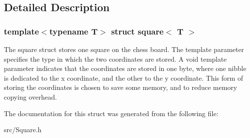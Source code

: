 \subsection{Detailed Description}
\subsubsection*{template$<$typename T$>$\newline
struct square$<$ T $>$}

The square struct stores one square on the chess board. The template parameter specifies the type in which the two coordinates are stored. A void template parameter indicates that the coordinates are stored in one byte, where one nibble is dedicated to the x coordinate, and the other to the y coordinate. This form of storing the coordinates is chosen to save some memory, and to reduce memory copying overhead. 

The documentation for this struct was generated from the following file\+:\begin{DoxyCompactItemize}
\item 
src/Square.\+h\end{DoxyCompactItemize}
